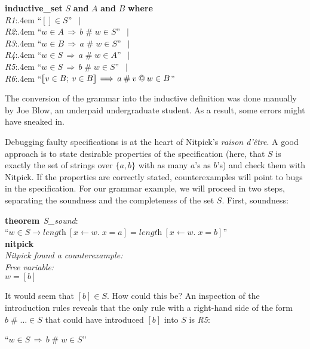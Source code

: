 \documentclass[a4paper,12pt]{article}
\begin{document}
\prew
\textbf{inductive\_set} $S$ \textbf{and} $A$ \textbf{and} $B$ \textbf{where} \\
\textit{R1}:\kern.4em ``$[] \in S$'' $\,\mid$ \\
\textit{R2}:\kern.4em ``$w \in A\,\Longrightarrow\, b \mathbin{\#} w \in S$'' $\,\mid$ \\
\textit{R3}:\kern.4em ``$w \in B\,\Longrightarrow\, a \mathbin{\#} w \in S$'' $\,\mid$ \\
\textit{R4}:\kern.4em ``$w \in S\,\Longrightarrow\, a \mathbin{\#} w \in A$'' $\,\mid$ \\
\textit{R5}:\kern.4em ``$w \in S\,\Longrightarrow\, b \mathbin{\#} w \in S$'' $\,\mid$ \\
\textit{R6}:\kern.4em ``$\mathopen{[\![} v \in B;\> v \in B\mathclose{]\!]} \,\Longrightarrow\, a \mathbin{\#} v \mathbin{@} w \in B$''
\postw

The conversion of the grammar into the inductive definition was done manually by
Joe Blow, an underpaid undergraduate student. As a result, some errors might
have sneaked in.

Debugging faulty specifications is at the heart of Nitpick's \textsl{raison
d'\^etre}. A good approach is to state desirable properties of the specification
(here, that $S$ is exactly the set of strings over $\{a, b\}$ with as many $a$'s
as $b$'s) and check them with Nitpick. If the properties are correctly stated,
counterexamples will point to bugs in the specification. For our grammar
example, we will proceed in two steps, separating the soundness and the
completeness of the set $S$. First, soundness:

\prew
\textbf{theorem}~\textit{S\_sound\/}: \\
``$w \in S \longrightarrow \textit{length}~[x\mathbin{\leftarrow} w.\; x = a] =
  \textit{length}~[x\mathbin{\leftarrow} w.\; x = b]$'' \\
\textbf{nitpick} \\[2\smallskipamount]
\slshape Nitpick found a counterexample: \\[2\smallskipamount]
\hbox{}\qquad Free variable: \nopagebreak \\
\hbox{}\qquad\qquad $w = [b]$
\postw

It would seem that $[b] \in S$. How could this be? An inspection of the
introduction rules reveals that the only rule with a right-hand side of the form
$b \mathbin{\#} {\ldots} \in S$ that could have introduced $[b]$ into $S$ is
\textit{R5}:

\prew
``$w \in S\,\Longrightarrow\, b \mathbin{\#} w \in S$''
\postw
\end{document}
